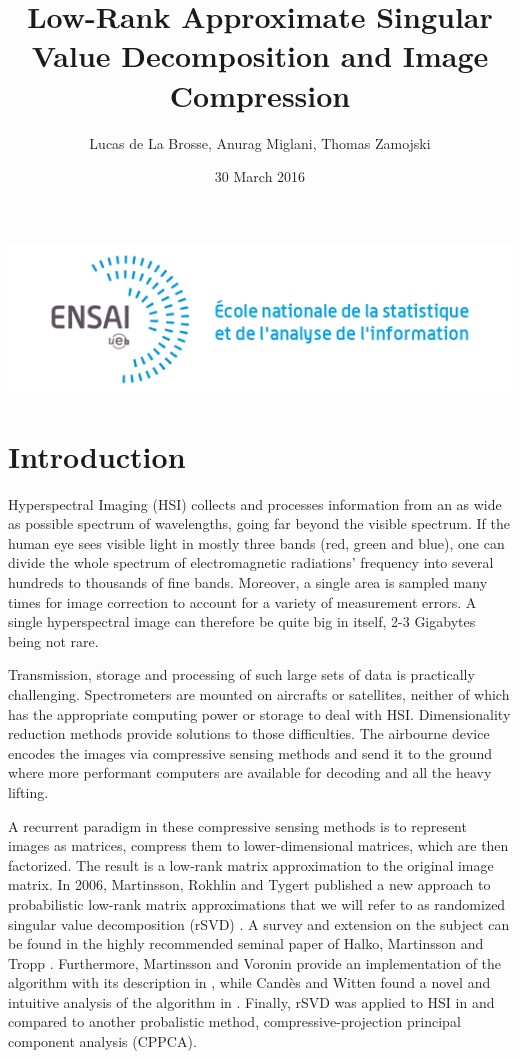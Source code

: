 \documentclass[a4paper,11pt]{amsart}
\date{30 March 2016}
\author{Lucas de La Brosse, Anurag Miglani, Thomas Zamojski}
\title{Low-Rank Approximate Singular Value Decomposition and Image Compression}
\begin{document}
\maketitle
\includegraphics{logo.png}

\section{Introduction}
Hyperspectral Imaging (HSI) collects and processes information from an as wide as possible spectrum of wavelengths, going far beyond the visible spectrum. If the human eye sees visible light in mostly three bands (red, green and blue), one can divide the whole spectrum of electromagnetic radiations' frequency into several hundreds to thousands of fine bands. Moreover, a single area is sampled many times for image correction to account for a variety of measurement errors. A single hyperspectral image can therefore be quite big in itself, 2-3 Gigabytes being not rare.

Transmission, storage and processing of such large sets of data is practically challenging. Spectrometers are mounted on aircrafts or satellites, neither of which has the appropriate computing power or storage to deal with HSI. Dimensionality reduction methods provide solutions to those difficulties. The airbourne device encodes the images via compressive sensing methods and send it to the ground where more performant computers are available for decoding and all the heavy lifting. 

A recurrent paradigm in these compressive sensing methods is to represent images as matrices, compress them to lower-dimensional matrices, which are then factorized. The result is a low-rank matrix approximation to the original image matrix. In 2006, Martinsson, Rokhlin and Tygert published a new approach to probabilistic low-rank matrix approximations that we will refer to as randomized singular value decomposition (rSVD) \cite{MRT}. A survey and extension on the subject can be found in the highly recommended seminal paper of Halko, Martinsson and Tropp \cite{HMT}. Furthermore, Martinsson and Voronin provide an implementation of the algorithm with its description in \cite{MV}, while Cand\`es and Witten found a novel and intuitive analysis of the algorithm in \cite{CW}. Finally, rSVD was applied to HSI in \cite{EHPZZ} and compared to another probalistic method, compressive-projection principal component analysis (CPPCA).
\end{document}
